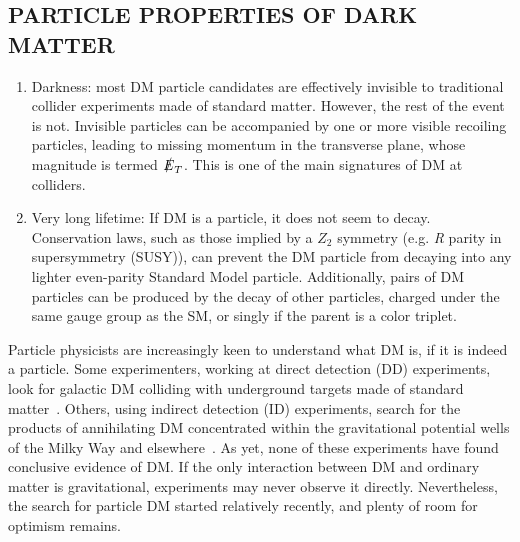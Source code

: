 \documentclass{ar-1col}
\newcommand{\MET}{\ensuremath{\slashed{E}_T}\xspace}
\begin{document}



\begin{textbox}
\section{PARTICLE PROPERTIES OF DARK MATTER}

\begin{enumerate} 

\item Darkness: most DM particle candidates are effectively invisible to
traditional collider experiments made of standard matter. However,
the rest of the event is not. Invisible particles can be
accompanied by one or more visible recoiling particles, leading to
missing momentum in the transverse plane, whose magnitude is
termed \MET. This is one of the main signatures of DM at
colliders.

\item Very long lifetime: If DM is a particle, it does not seem to decay.
Conservation laws, such as those implied by a $Z_2$ symmetry (e.g. \textit{R} parity in supersymmetry (SUSY)), 
can prevent the DM particle from decaying into any
lighter even-parity Standard Model particle. Additionally, pairs of DM
particles can be produced by the decay of other particles, charged
under the same gauge group as the SM, or singly if the
parent is a color triplet.

\end{enumerate} 

\end{textbox}

Particle physicists are increasingly keen to understand
what DM is, if it is indeed a particle. Some
experimenters, working at \MakeLowercase{Direct Detection} (DD) experiments, look for
galactic DM colliding with underground targets made of standard matter~\cite{0954-3899-43-1-013001}. 
Others, using \MakeLowercase{Indirect Detection} (ID) experiments, search for the products of
annihilating DM concentrated within the gravitational
potential wells of the Milky Way and
elsewhere~\cite{Gaskins:2016cha}. As yet, none of these experiments have
found conclusive evidence of DM. If the only interaction
between DM and ordinary matter is gravitational, experiments may never
observe it directly. Nevertheless, the search for particle DM started relatively
recently, and plenty of room for optimism remains.
\end{document}
